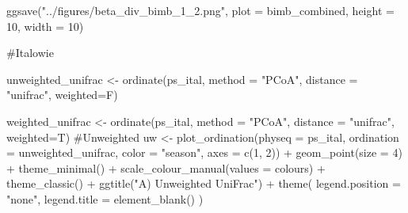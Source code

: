 \documentclass[
  letterpaper,
  DIV=11,
  numbers=noendperiod]{scrartcl}
\newenvironment{Shaded}{\begin{snugshade}}{\end{snugshade}}
\newcommand{\AttributeTok}[1]{\textcolor[rgb]{0.40,0.45,0.13}{#1}}
\newcommand{\CommentTok}[1]{\textcolor[rgb]{0.37,0.37,0.37}{#1}}
\newcommand{\DecValTok}[1]{\textcolor[rgb]{0.68,0.00,0.00}{#1}}
\newcommand{\FunctionTok}[1]{\textcolor[rgb]{0.28,0.35,0.67}{#1}}
\newcommand{\NormalTok}[1]{\textcolor[rgb]{0.00,0.23,0.31}{#1}}
\newcommand{\OtherTok}[1]{\textcolor[rgb]{0.00,0.23,0.31}{#1}}
\newcommand{\SpecialCharTok}[1]{\textcolor[rgb]{0.37,0.37,0.37}{#1}}
\newcommand{\StringTok}[1]{\textcolor[rgb]{0.13,0.47,0.30}{#1}}
\begin{document}
\begin{Shaded}
\begin{Highlighting}[]
\FunctionTok{ggsave}\NormalTok{(}\StringTok{"../figures/beta\_div\_bimb\_1\_2.png"}\NormalTok{, }\AttributeTok{plot =}\NormalTok{ bimb\_combined, }\AttributeTok{height =} \DecValTok{10}\NormalTok{, }\AttributeTok{width =} \DecValTok{10}\NormalTok{)}




\CommentTok{\#Italowie}

\NormalTok{unweighted\_unifrac }\OtherTok{\textless{}{-}} \FunctionTok{ordinate}\NormalTok{(ps\_ital, }
                               \AttributeTok{method =} \StringTok{"PCoA"}\NormalTok{, }
                               \AttributeTok{distance =} \StringTok{"unifrac"}\NormalTok{, }\AttributeTok{weighted=}\NormalTok{F)}

\NormalTok{weighted\_unifrac }\OtherTok{\textless{}{-}} \FunctionTok{ordinate}\NormalTok{(ps\_ital, }
                               \AttributeTok{method =} \StringTok{"PCoA"}\NormalTok{, }
                               \AttributeTok{distance =} \StringTok{"unifrac"}\NormalTok{, }\AttributeTok{weighted=}\NormalTok{T)}
\CommentTok{\#Unweighted}
\NormalTok{uw }\OtherTok{\textless{}{-}} \FunctionTok{plot\_ordination}\NormalTok{(}\AttributeTok{physeq =}\NormalTok{ ps\_ital,}
                \AttributeTok{ordination =}\NormalTok{ unweighted\_unifrac,}
                \AttributeTok{color =} \StringTok{"season"}\NormalTok{,}
                \AttributeTok{axes =} \FunctionTok{c}\NormalTok{(}\DecValTok{1}\NormalTok{, }\DecValTok{2}\NormalTok{)) }\SpecialCharTok{+}
  \FunctionTok{geom\_point}\NormalTok{(}\AttributeTok{size =} \DecValTok{4}\NormalTok{) }\SpecialCharTok{+}
  \FunctionTok{theme\_minimal}\NormalTok{() }\SpecialCharTok{+}
  \FunctionTok{scale\_colour\_manual}\NormalTok{(}\AttributeTok{values =}\NormalTok{ colours) }\SpecialCharTok{+}
  \FunctionTok{theme\_classic}\NormalTok{() }\SpecialCharTok{+}
  \FunctionTok{ggtitle}\NormalTok{(}\StringTok{"A) Unweighted UniFrac"}\NormalTok{) }\SpecialCharTok{+}
  \FunctionTok{theme}\NormalTok{(}
    \AttributeTok{legend.position =} \StringTok{"none"}\NormalTok{,}
    \AttributeTok{legend.title =} \FunctionTok{element\_blank}\NormalTok{()}
\NormalTok{    ) }


\end{Highlighting}
\end{Shaded}
\end{document}
